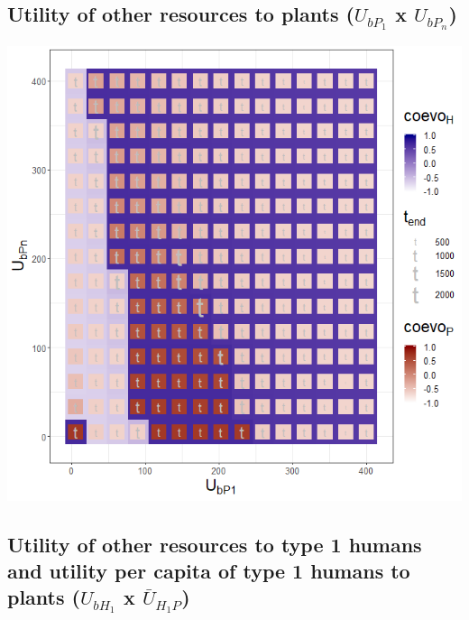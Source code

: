 \documentclass[
]{book}
\begin{document}
\newpage

\hypertarget{utility-of-other-resources-to-plants-u_bp_1-x-u_bp_n}{%
\subsection{\texorpdfstring{Utility of other resources to plants (\(U_{bP_{1}}\) x \(U_{bP_{n}}\))}{Utility of other resources to plants (U\_\{bP\_\{1\}\} x U\_\{bP\_\{n\}\})}}\label{utility-of-other-resources-to-plants-u_bp_1-x-u_bp_n}}


\includegraphics[width=1\linewidth]{plots/3_twoPar-U.bP1-U.bPn_plot}

\hypertarget{utility-of-other-resources-to-type-1-humans-and-utility-per-capita-of-type-1-humans-to-plants-u_bh_1-x-baru_h_1p}{%
\subsection{\texorpdfstring{Utility of other resources to type 1 humans and utility per capita of type 1 humans to plants (\(U_{bH_{1}}\) x \(\bar{U}_{H_{1}P}\))}{Utility of other resources to type 1 humans and utility per capita of type 1 humans to plants (U\_\{bH\_\{1\}\} x \textbackslash bar\{U\}\_\{H\_\{1\}P\})}}\label{utility-of-other-resources-to-type-1-humans-and-utility-per-capita-of-type-1-humans-to-plants-u_bh_1-x-baru_h_1p}}
\end{document}
